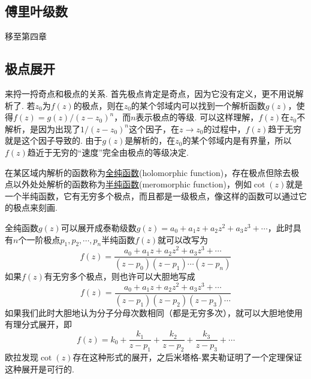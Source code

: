 \documentclass[UTF8]{ctexart}
\begin{document}

\subsection{傅里叶级数}

移至第四章

\subsection{极点展开}

来捋一捋奇点和极点的关系. 首先极点肯定是奇点，因为它没有定义，更不用说解析了. 若\(z_0\)为\(f(z)\)的极点，则在\(z_0\)的某个邻域内可以找到一个解析函数\(g(z)\)，使得\(f(z)=g(z)/(z-z_0)^n\)，而\(n\)表示极点的等级. 可以这样理解，\(f(z)\)在\(z_0\)不解析，是因为出现了\(1/(z-z_0)^n\)这个因子，在\(z \to z_0\)的过程中，\(f(z)\)趋于无穷就是这个因子导致的. 由于\(g(z)\)是解析的，在\(z_0\)的某个邻域内是有界量，所以\(f(z)\)趋近于无穷的“速度”完全由极点的等级决定.

在某区域内解析的函数称为\uline{全纯函数}(holomorphic function)，存在极点但除去极点以外处处解析的函数称为\uline{半纯函数}(meromorphic function)，例如\(\cot(z)\)就是一个半纯函数，它有无穷多个极点，而且都是一级极点，像这样的函数可以通过它的极点来刻画. 

全纯函数\(g(z)\)可以展开成泰勒级数\(g(z)=a_0+a_1z+a_2z^2+a_3z^3+\cdots\)，此时具有\(n\)个一阶极点\(p_1, p_2, \cdots, p_n\)半纯函数\(f(z)\)就可以改写为
\[f(z)=\frac{a_0+a_1z+a_2z^2+a_3z^3+\cdots}{(z-p_0)(z-p_1)\cdots(z-p_n)}\]
如果\(f(z)\)有无穷多个极点，则也许可以大胆地写成
\[f(z)=\frac{a_0+a_1z+a_2z^2+a_3z^3+\cdots}{(z-p_1)(z-p_2)(z-p_3)\cdots}\]
如果我们此时大胆地认为分子分母次数相同（都是无穷多次），就可以大胆地使用有理分式展开，即
\[f(z)=k_0+\frac{k_1}{z-p_1}+\frac{k_2}{z-p_2}+\frac{k_3}{z-p_3}+\cdots\]
欧拉发现\(\cot(z)\)存在这种形式的展开，之后米塔格-累夫勒证明了一个定理保证这种展开是可行的.
\end{document}
